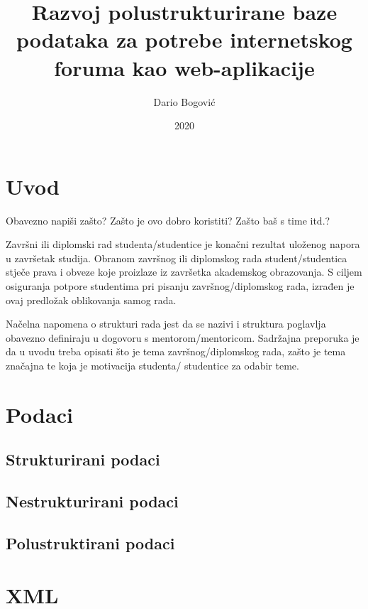 \documentclass{foi}
\title{Razvoj polustrukturirane baze podataka za potrebe internetskog foruma kao web-aplikacije}
\author{Dario Bogović}
\date{2020}
\begin{document}
\maketitle

\tableofcontents

\pagestyle{plain}
\chapter{Uvod}

Obavezno napiši zašto? Zašto je ovo dobro koristiti? Zašto baš s time itd.?

Završni ili diplomski rad studenta/studentice je konačni rezultat uloženog napora u završetak studija. Obranom završnog ili diplomskog rada student/studentica stječe prava i obveze koje proizlaze iz završetka akademskog obrazovanja. S ciljem osiguranja potpore studentima pri pisanju završnog/diplomskog rada, izrađen je ovaj predložak oblikovanja samog rada.

Načelna napomena o strukturi rada jest da se nazivi i struktura poglavlja obavezno definiraju u dogovoru s mentorom/mentoricom. Sadržajna preporuka je da u uvodu treba opisati što je tema završnog/diplomskog rada, zašto je tema značajna te koja je motivacija studenta/ studentice za odabir teme. 

\chapter{Podaci}

\lipsum[1]

\section{Strukturirani podaci}

\lipsum[1]

\section{Nestrukturirani podaci}

\lipsum[1]

\section{Polustruktirani podaci}

\lipsum[1]

\chapter{XML}
\end{document}
